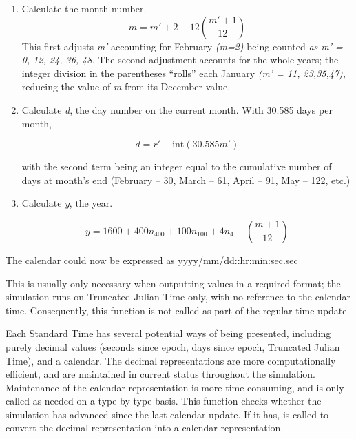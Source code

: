 {\begin{enumerate}
{\begin{enumerate}
\begin{enumerate}
\begin{equation*}
m'=\text{int}\left(\frac{r'}{30.585}\right)
\end{equation*}

With approximately 30.585 days per month, the number of months in the 4-year
period can be determined.


\item Calculate  
the month
number.  
\begin{equation*}
m=m'+2-12\left(\frac{m'+1}{12}\right) 
\end{equation*}
This first adjusts \textit{m'} accounting for
February \textit{(m=2) }being counted \textit{as m' =
0, 12, 24, 36, 48.  }The second adjustment accounts for the whole
years; the integer division in the parentheses
{\textquotedblleft}rolls{\textquotedblright} each January
\textit{(m' = 11, 23,35,47), }reducing the value of
\textit{m} from its December value.
\item Calculate \textit{d}, the day number on the current month.  With
30.585 days per month,  

\begin{equation*}
d=r'-\text{int}\left(30.585m'\right)
\end{equation*}

with the
second term being an integer equal to the cumulative number of days at
month's end (February -- 30, March -- 61, April -- 91,
May -- 122, etc.)

\item Calculate \textit{y}, the year.  

\begin{equation*}
y=1600+400n_{400}+100n_{100}+4n_{4}+\left(\frac{m+1}{12}\right)
\end{equation*}

\end{enumerate}
The calendar could now be expressed as  yyyy/mm/dd::hr:min:sec.sec




This is usually only necessary when outputting values in a required
format; the simulation runs on Truncated Julian Time only, with no
reference to the calendar time.  Consequently, this function is not
called as part of the regular time update.




Each Standard Time has several potential ways of being presented,
including purely decimal values (seconds since epoch, days since epoch,
Truncated Julian Time), and a calendar.  The decimal representations
are more computationally efficient, and are maintained in current
status throughout the simulation.  Maintenance of the calendar
representation is more time-consuming, and is only called as needed on
a type-by-type basis.  This function checks whether the simulation has
advanced since the last calendar update.  If it has,
is called to convert the
decimal representation into a calendar representation.


\end{enumerate}}
\end{enumerate}}
